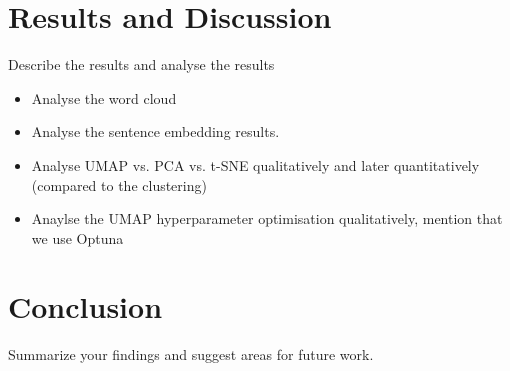 \documentclass[10pt,oneside]{report}
\begin{document}
\chapter{Results and Discussion}
Describe the results and analyse the results

\begin{itemize}
    \item Analyse the word cloud 
    \item Analyse the sentence embedding results.
    \item Analyse UMAP vs. PCA vs. t-SNE qualitatively and later quantitatively (compared to the clustering)
    \item Anaylse the UMAP hyperparameter optimisation qualitatively, mention that we use Optuna
\end{itemize}

\chapter{Conclusion}
Summarize your findings and suggest areas for future work.


\end{document}
